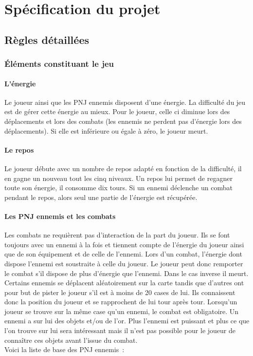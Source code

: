 \documentclass[11pt]{article}
\begin{document}
\section{Spécification du projet}

\subsection{Règles détaillées}

\subsubsection{Éléments constituant le jeu}

\paragraph{L’énergie}

Le joueur ainsi que les PNJ ennemis disposent d'une énergie. La difficulté du jeu est  de gérer cette énergie au mieux. Pour le joueur, celle ci diminue lors des déplacements et lors des combats (les ennemis ne perdent pas d'énergie lors des déplacements). Si elle est inférieure ou égale à zéro, le joueur meurt.

\paragraph{Le repos}

Le joueur débute avec un nombre de repos adapté en fonction de la difficulté, il en gagne un nouveau tout les cinq niveaux. Un repos lui permet de regagner toute son énergie, il consomme dix tours. Si un ennemi déclenche un combat pendant le repos, alors seul une partie de l'énergie est récupérée.

\paragraph{Les PNJ ennemis et les combats}

Les combats ne requièrent pas d'interaction de la part du joueur. Ils se font toujours avec un ennemi à la fois et tiennent compte de l'énergie du joueur ainsi que de son équipement et de celle de l'ennemi. Lors d'un combat, l'énergie dont dispose l'ennemi est soustraite à celle du joueur. Le joueur peut donc remporter le combat s'il dispose de plus d'énergie que l'ennemi. Dans le cas inverse il meurt.\\
Certains ennemis se déplacent aléatoirement sur la carte tandis que d'autres ont pour but de pister le joueur s'il est à moins de 20 cases de lui. Ils connaissent donc la position du joueur et se rapprochent de lui tour après tour. Lorsqu'un joueur se trouve sur la même case qu'un ennemi, le combat est obligatoire. Un ennemi a sur lui des objets et/ou de l'or. Plus l'ennemi est puissant et plus ce que l'on trouve sur lui sera intéressant mais il n'est pas possible pour le joueur de connaître ces objets avant l'issue du combat.\\
Voici la liste de base des PNJ ennemis~:
\end{document}
